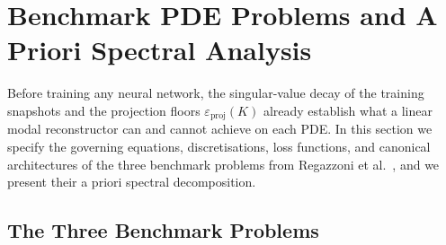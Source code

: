 \section{Benchmark PDE Problems and A Priori Spectral Analysis}
\label{sec:problems}

Before training any neural network, the singular-value decay of the training snapshots and the projection floors $\varepsilon_{\mathrm{proj}}(K)$ already establish what a linear modal reconstructor can and cannot achieve on each PDE. In this section we specify the governing equations, discretisations, loss functions, and canonical architectures of the three benchmark problems from Regazzoni et al.~\cite{regazzoni2024learning}, and we present their a priori spectral decomposition.

\subsection{The Three Benchmark Problems}

